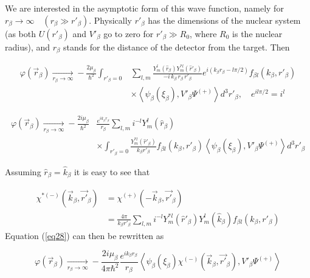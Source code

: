 We are interested in the asymptotic form of this wave function, namely for $r_\beta \longrightarrow \infty \quad (r_\beta \gg r'_\beta)$. Physically $r'_\beta$ has the dimensions of the nuclear system (as both $ U(r'_\beta)$ and $V'_\beta$ go to zero for $r'_\beta \gg R_0$, where $R_0$ is the nuclear radius), and $r_\beta$ stands for the distance of the detector from the target. Then




\begin{equation}\label{eq27}
\begin{split}
\varphi(\vec r_{\beta}) \xrightarrow[r_\beta \rightarrow \infty]{} -\frac{2 \mu_{\beta}}{\hbar^2} \int_{r'_{\beta}=0} &
\sum_{l,m}  \frac{Y_m^l(\hat r_ \beta)Y_m^{*l}(\hat r'_ \beta)}{-i \, k_\beta \, r_ \beta\, r'_ \beta}
e^{i(k_\beta r_ \beta-l\pi/2)}f_{\beta l}(k_\beta, r'_ \beta) \\
& \times \left\langle
\psi_\beta (\xi_\beta),V'_\beta \Psi^{(+)}\right\rangle d^3 r'_ \beta,\quad e^{i l\pi/2}=i^l
\end{split}
\end{equation}


\begin{equation}\label{eq28}
\begin{split}
\varphi(\vec r_{\beta}) \xrightarrow[r_\beta \rightarrow \infty]{} -\frac{2i \mu_{\beta}}{\hbar^2} &
\frac{e^{i k_\beta r_\beta}}{r_\beta} \sum_{l,m} i^{-l} Y_m^l(\hat r_ \beta)\\
& \times \int_{r'_{\beta}=0}
\frac{Y_m^{*l}(\hat r'_ \beta)}{k_\beta r'_\beta} f_{\beta l}(k_\beta, r'_ \beta) \left\langle
\psi_\beta (\xi_\beta),V'_\beta \Psi^{(+)}\right\rangle d^3 r'_ \beta
\end{split}
\end{equation}

Assuming $\hat r_ \beta=\hat k_ \beta$ it is easy to see that

\begin{equation}\label{eq29}
\begin{split}
\chi^{*(-)}(\vec k_\beta, \vec {r'}_\beta)& = \chi^{(+)}(-\vec k_\beta,\vec {r'}_\beta)\\
&=\frac{4\pi}{k_\beta r'_\beta}\sum_{l,m} i^{-l} Y_m^{*l}(\hat r'_ \beta)Y_m^l(\hat k_ \beta) f_{\beta l}(k_\beta, r'_ \beta)
\end{split}
\end{equation}
Equation (\ref{eq28}) can then be rewritten as

\begin{equation}\label{eq30}
\varphi(\vec r_{\beta}) \xrightarrow[r_\beta \rightarrow \infty]{} -\frac{2i \mu_{\beta}}{4\pi\hbar^2} \frac{e^{i k_\beta r_\beta}}{r_\beta} \left\langle
\psi_\beta (\xi_\beta)\chi^{(-)}(\vec k_\beta, \vec {r'}_\beta),V'_\beta \Psi^{(+)}\right\rangle
\end{equation}

